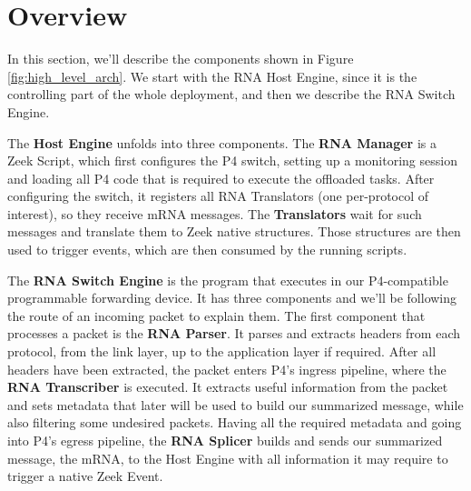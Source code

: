 \section{Overview}

In this section, we'll describe the components shown in Figure \ref{fig:high_level_arch}. We start with the RNA Host Engine, since it is the controlling part of the whole deployment, and then we describe the RNA Switch Engine.


The \textbf{Host Engine} unfolds into three components. The \textbf{RNA Manager} is a Zeek Script, which first configures the P4 switch, setting up a monitoring session and loading all P4 code that is required to execute the offloaded tasks. After configuring the switch, it registers all RNA Translators (one per-protocol of interest), so they receive mRNA messages. The \textbf{Translators} wait for such messages and translate them to Zeek native structures. Those structures are then used to trigger events, which are then consumed by the running scripts.


The \textbf{RNA Switch Engine} is the program that executes in our P4-compatible programmable forwarding device. It has three components and we'll be following the route of an incoming packet to explain them. The first component that processes a packet is the \textbf{RNA Parser}. It parses and extracts headers from each protocol, from the link layer, up to the application layer if required. After all headers have been extracted, the packet enters P4's ingress pipeline, where the \textbf{RNA Transcriber} is executed. It extracts useful information from the packet and sets metadata that later will be used to build our summarized message, while also filtering some undesired packets. Having all the required metadata and going into P4's egress pipeline, the \textbf{RNA Splicer} builds and sends our summarized message, the mRNA, to the Host Engine with all information it may require to trigger a native Zeek Event.


